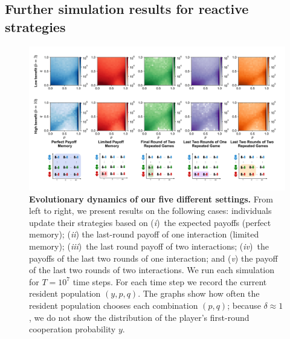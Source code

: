 \documentclass[11pt]{article}
\theoremstyle{plainCl1}
\theoremstyle{plainCl2}
\begin{document}

\subsection{Further simulation results for reactive strategies}\label{section:simulation_results}

\begin{figure}[t!]
    \centering 
    \includegraphics[width=\textwidth]{static/more_memory_heatmaps_donation_game_with_illustrations.pdf}
    \caption{\textbf{Evolutionary dynamics of our five different settings.}
    From left to right, we present results on the following cases: individuals update their strategies based on
    ({\it i})~the expected payoffs (perfect memory); ({\it ii}) the last-round payoff
    of one interaction (limited memory); ({\it iii})~the last round payoff of two
    interactions; ({\it iv})~the payoffs of the last two rounds of one interaction; 
    and ({\it v}) the payoff of the last two rounds of two interactions. We run each simulation for \(T
    = 10^7\) time steps. For each time step we record the current resident
    population \((y, p, q)\). The graphs show how often the
    resident population chooses each combination \((p, q)\); because $\delta\!\approx\!1$, we do not show the distribution of the player's first-round cooperation probability $y$.}\label{fig:expected_payoffs_results}
    \end{figure}
\end{document}
